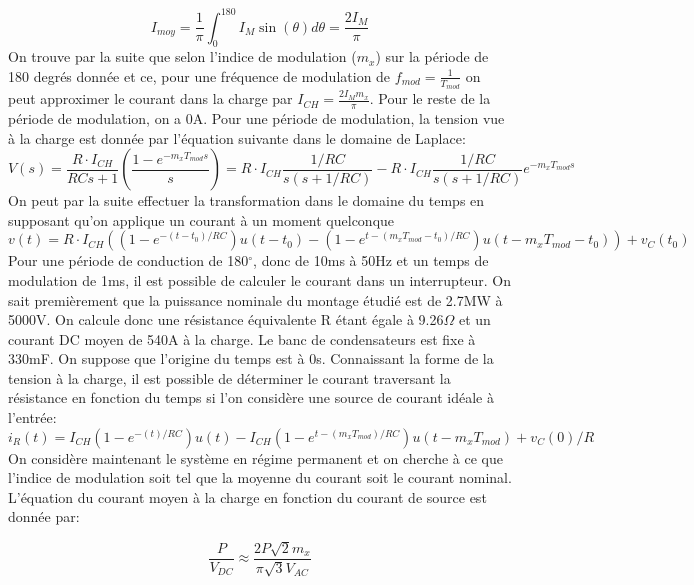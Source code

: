 \begin{equation}
I_{moy} = \frac{1}{\pi}\int_{0}^{180} I_M \sin(\theta)d\theta = \frac{2I_M}{\pi}
\end{equation}
On trouve par la suite que selon l'indice de modulation ($m_x$) sur la période de 180 degrés donnée et ce, pour une fréquence de modulation de $f_{mod} = \frac{1}{T_{mod}}$ on peut approximer le courant dans la charge par $I_{CH} = \frac{2I_M m_x}{\pi}$. Pour le reste de la période de modulation, on a 0A. Pour une période de modulation, la tension vue à la charge est donnée par l'équation suivante dans le domaine de Laplace:
\begin{equation}
V(s) = \frac{R\cdot I_{CH}}{RCs + 1} \left(\frac{1 - e^{-m_xT_{mod}s}}{s}\right) = R\cdot I_{CH}\frac{1/RC}{s(s + 1/RC)} - R\cdot I_{CH}\frac{1/RC}{s(s + 1/RC)}e^{-m_xT_{mod}s}
\end{equation}
On peut par la suite effectuer la transformation dans le domaine du temps en supposant qu'on applique un courant à un moment quelconque
\begin{equation}
v(t) = R\cdot I_{CH}\left((1-e^{-(t-t_0)/RC})u(t-t_0) - (1-e^{t-(m_xT_{mod}-t_0)/RC})u(t-m_xT_{mod}-t_0)\right) + v_C(t_0)
\end{equation}
Pour une période de conduction de 180$^\circ$, donc de 10ms à 50Hz et un temps de modulation de 1ms, il est possible de calculer le courant dans un interrupteur. On sait premièrement que la puissance nominale du montage étudié est de 2.7MW à 5000V. On calcule donc une résistance équivalente R étant égale à 9.26$\Omega$ et un courant DC moyen de 540A à la charge. Le banc de condensateurs est fixe à 330mF. On suppose que l'origine du temps est à 0s. Connaissant la forme de la tension à la charge, il est possible de déterminer le courant traversant la résistance en fonction du temps si l'on considère une source de courant idéale à l'entrée:
\begin{equation}
i_R(t) = I_{CH}(1-e^{-(t)/RC})u(t) - I_{CH}(1-e^{t-(m_xT_{mod})/RC})u(t-m_xT_{mod}) + v_C(0)/R
\end{equation}
On considère maintenant le système en régime permanent et on cherche  à ce que l'indice de modulation soit tel que la moyenne du courant soit le courant nominal. L'équation du courant moyen à la charge en fonction du courant de source est donnée par:

\begin{equation}
\frac{P}{V_{DC}} \approx \frac{2 P \sqrt{2} m_x}{\pi \sqrt{3}V_{AC}}
\end{equation} 

